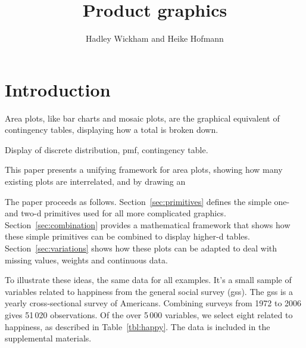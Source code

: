 \documentclass[letterpaper,oneside]{scrartcl}
\title{Product graphics}
\author{Hadley Wickham and Heike Hofmann}
\begin{document}
\maketitle

\section{Introduction}


%
%

Area plots, like bar charts and mosaic plots, are the graphical equivalent of contingency tables, displaying how a total is broken down.

Display of discrete distribution, pmf, contingency table.

This paper presents a unifying framework for area plots, showing how many existing plots are interrelated, and by drawing an

The paper proceeds as follows. Section~\ref{sec:primitives} defines the simple one- and two-d primitives used for all more complicated graphics. Section~\ref{sec:combination} provides a mathematical framework that shows how these simple primitives can be combined to display higher-d tables. Section~\ref{sec:variations} shows how these plots can be adapted to deal with missing values, weights and continuous data.

To illustrate these ideas, the same data for all examples. It's a small sample
of variables related to happiness from the general social survey ({\sc gss}).
The {\sc gss} is a yearly cross-sectional survey of Americans. Combining
surveys from 1972 to 2006 gives 51\,020 observations. Of the over 5\,000
variables, we select eight related to happiness, as described in
Table~\ref{tbl:happy}. The data is included in the supplemental materials.
\end{document}
